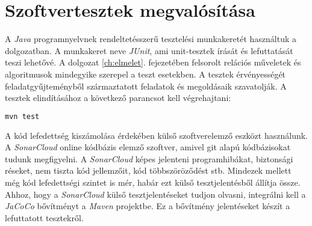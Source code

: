 \section{Szoftvertesztek megvalósítása}

A \textit{Java} programnyelvnek rendeltetésszerű tesztelési munkakeretét használtuk a dolgozatban. A munkakeret neve \textit{JUnit}, ami unit-tesztek írását és lefuttatását teszi lehetővé. A dolgozat \ref{ch:elmelet}. fejezetében felsorolt relációs műveletek és algoritmusok mindegyike szerepel a teszt esetekben. A tesztek érvényességét feladatgyűjteményből \parencite{kordic2018} származtatott feladatok és megoldásaik szavatolják. A tesztek elindításához a következő parancsot kell végrehajtani:

\linespread{1}
\begin{lstlisting}[language=sh]
mvn test
\end{lstlisting}

A kód lefedettség kiszámolása érdekében külső szoftverelemző eszközt használunk. A \textit{SonarCloud} online kódbázis elemző szoftver, amivel git alapú kódbázisokat tudunk megfigyelni. A \textit{SonarCloud} képes jelenteni programhibákat, biztonsági réseket, nem tiszta kód jellemzőit, kód többszöröződést stb. Mindezek mellett még kód lefedettségi szintet is mér, habár ezt külső tesztjelentésből állítja össze. Ahhoz, hogy a \textit{SonarCloud} külső tesztjelentéseket tudjon olvasni, integrálni kell a \textit{JaCoCo} bővítményt a \textit{Maven} projektbe. Ez a bővítmény jelentéseket készít a lefuttatott tesztekről.

